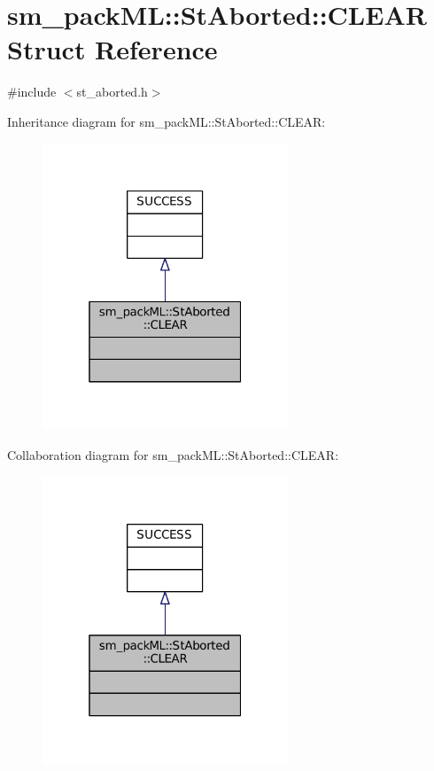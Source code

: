 \hypertarget{structsm__packML_1_1StAborted_1_1CLEAR}{}\section{sm\+\_\+pack\+ML\+:\+:St\+Aborted\+:\+:C\+L\+E\+AR Struct Reference}
\label{structsm__packML_1_1StAborted_1_1CLEAR}


{\ttfamily \#include $<$st\+\_\+aborted.\+h$>$}



Inheritance diagram for sm\+\_\+pack\+ML\+:\+:St\+Aborted\+:\+:C\+L\+E\+AR\+:
\nopagebreak
\begin{figure}[H]
\begin{center}
\leavevmode
\includegraphics[width=208pt]{structsm__packML_1_1StAborted_1_1CLEAR__inherit__graph}
\end{center}
\end{figure}


Collaboration diagram for sm\+\_\+pack\+ML\+:\+:St\+Aborted\+:\+:C\+L\+E\+AR\+:
\nopagebreak
\begin{figure}[H]
\begin{center}
\leavevmode
\includegraphics[width=208pt]{structsm__packML_1_1StAborted_1_1CLEAR__coll__graph}
\end{center}
\end{figure}


